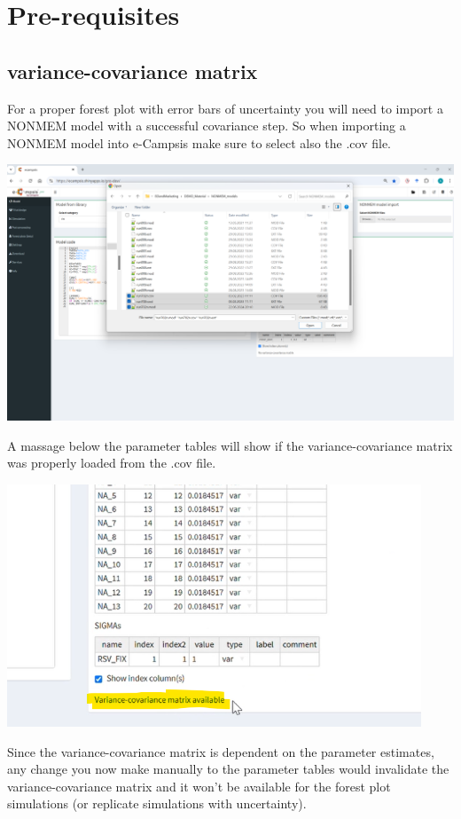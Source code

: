 \documentclass[
]{book}
\begin{document}
\section{Pre-requisites}\label{pre-requisites}

\subsection{variance-covariance matrix}\label{variance-covariance-matrix}

For a proper forest plot with error bars of uncertainty you will need to import a NONMEM model with a successful covariance step. So when importing a NONMEM model into e-Campsis make sure to select also the .cov file.

\includegraphics{pictures/import_cov_file.png}

A massage below the parameter tables will show if the variance-covariance matrix was properly loaded from the .cov file.

\includegraphics[width=4.86458in,height=\textheight]{pictures/cov_message.png}

Since the variance-covariance matrix is dependent on the parameter estimates, any change you now make manually to the parameter tables would invalidate the variance-covariance matrix and it won't be available for the forest plot simulations (or replicate simulations with uncertainty).
\end{document}
